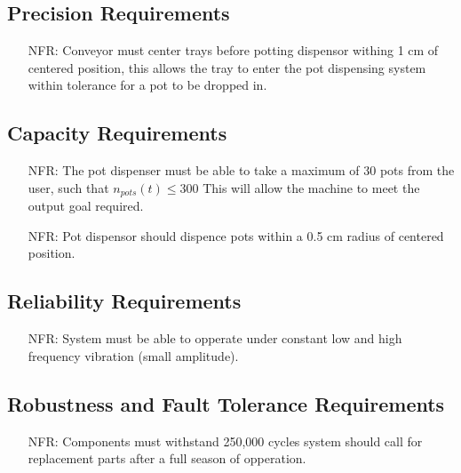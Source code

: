\documentclass[12pt]{article}
\newcounter{nfrnum} %
\begin{document}
  \subsection{Precision Requirements}
  \noindent \begin{itemize}
  \item[NFR\refstepcounter{nfrnum}\thenfrnum \label{NFR_Portability9}:]
  Conveyor must center trays before potting dispensor withing 1 cm of centered position, this allows the tray to enter the pot dispensing system within tolerance for a pot to be dropped in.
  \end{itemize}


  \subsection{Capacity Requirements}
  \noindent \begin{itemize}
  \item[NFR\refstepcounter{nfrnum}\thenfrnum \label{NFR_Portability10}:] {The pot dispenser must
  be able to take a maximum of 30 pots from the user, such that 
  $n_{pots}(t)\le300$} 
  This will allow the machine to meet the output goal required.


  \item[NFR\refstepcounter{nfrnum}\thenfrnum \label{NFR_Portability11}:]
  Pot dispensor should dispence pots within a 0.5 cm radius of centered position.
  \end{itemize}


  \subsection{Reliability Requirements}
  \noindent \begin{itemize}
  \item[NFR\refstepcounter{nfrnum}\thenfrnum \label{NFR_Portability12}:]
  System must be able to opperate under constant low and high frequency vibration (small amplitude).
  
  \end{itemize}


  \subsection{Robustness and Fault Tolerance Requirements}
  \noindent \begin{itemize}
  \item[NFR\refstepcounter{nfrnum}\thenfrnum \label{NFR_Portability19}:]
  Components must withstand 250,000 cycles system should call for replacement parts after a full season of opperation.
  
  \end{itemize}
\end{document}
